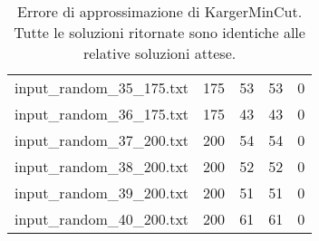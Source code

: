 \begin{table}[H]
\begin{tabular}{lrccc}
     input\_random\_35\_175.txt &     175 &        53 &                 53 &               0 \\
     input\_random\_36\_175.txt &     175 &        43 &                 43 &               0 \\
     input\_random\_37\_200.txt &     200 &        54 &                 54 &               0 \\
     input\_random\_38\_200.txt &     200 &        52 &                 52 &               0 \\
     input\_random\_39\_200.txt &     200 &        51 &                 51 &               0 \\
     input\_random\_40\_200.txt &     200 &        61 &                 61 &               0 \\
     \hline
    \end{tabular}

    \caption{Errore di approssimazione di KargerMinCut. Tutte le soluzioni ritornate sono identiche alle relative soluzioni attese.}
    \label{table:karger-approx-error}
\end{table}


